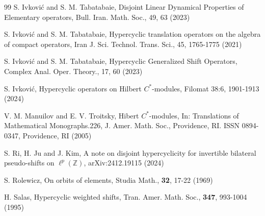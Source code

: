 \documentclass{article}
\begin{document}
\begin{thebibliography}{99}
\newblock S. Ivkovi\'{c} and S. M. Tabatabaie,
\newblock Disjoint Linear Dynamical Properties of Elementary operators,
\newblock Bull. Iran. Math. Soc., 49, 63 (2023)

\newblock S. Ivkovi\'{c} and S. M. Tabatabaie,
\newblock Hypercyclic translation operators on the algebra of compact operators,
\newblock Iran J. Sci. Technol. Trans. Sci., 45, 1765-1775 (2021)

\newblock S. Ivkovi\'{c} and S. M. Tabatabaie,
\newblock Hypercyclic Generalized Shift Operators,
\newblock Complex Anal. Oper. Theory., 17, 60 (2023)

\newblock S. Ivkovi\'{c},
\newblock Hypercyclic operators on Hilbert $C^{\ast}$-modules,
\newblock Filomat 38:6, 1901-1913 (2024)


\newblock V. M. Manuilov and E. V. Troitsky,
\newblock Hibert $C^{\ast}$-modules,
\newblock In: Translations of Mathematical Monographs.226,
\newblock J. Amer. Math. Soc., Providence, RI. ISSN 0894-0347, Providence, RI (2005)

\newblock S. Ri, H. Ju and J. Kim,
\newblock A note on disjoint hypercyclicity for invertible bilateral pseudo-shifts on $\ell^{p}(\mathbb{Z})$,
\newblock arXiv:2412.19115 (2024)

\newblock S. Rolewicz,
\newblock On orbits of elements,
\newblock Studia Math., \textbf{32}, 17-22 (1969)

\newblock H. Salas,
\newblock Hypercyclic weighted shifts,
\newblock Tran. Amer. Math. Soc., \textbf{347}, 993-1004 (1995)

\end{thebibliography}
\end{document}
